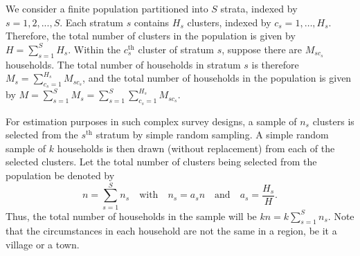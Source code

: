 \documentclass[12pt]{article}
\theoremstyle{plain}
\theoremstyle{definition}
\begin{document}
We consider a finite population partitioned into 
$S$ strata, indexed by $s=1,2,...,S$. Each stratum 
$s$ contains $H_s$ clusters, indexed by $c_s=1,\ldots,H_s$. Therefore, the total number of clusters in the population is given by $H=\sum_{s=1}^{S}H_s$. Within the $c_s^{\text{th}}$ cluster of stratum $s$, suppose there are $M_{sc_s}$ households. The total number of households in stratum $s$ is therefore $M_s=\sum_{c_s=1}^{H_s} M_{sc_s} $, and the total number of households in the population is given by $M=\sum_{s=1}^S M_s =\sum_{s=1}^S\sum_{c_s=1}^{H_s} M_{sc_s}$.

For estimation purposes in such complex survey designs, a sample of $n_s$ clusters is selected from the $s^{\text{th}}$ stratum by simple random sampling. A simple random sample of $k$ households is then drawn (without replacement) from each of the selected clusters. Let the total number of clusters being selected from the population be denoted by
\begin{equation}\label{eq:n-ns-as}
n=\sum_{s=1}^{S}n_s \quad\text{with}\quad n_s=a_sn\quad \text{and}\quad 
a_s=\frac{H_s}{H}.
\end{equation}
Thus, the total number of households in the sample will be $kn=k\sum_{s=1}^Sn_s$. Note that the circumstances in each household are not the same in a region, be it a village or a town. %
\end{document}
